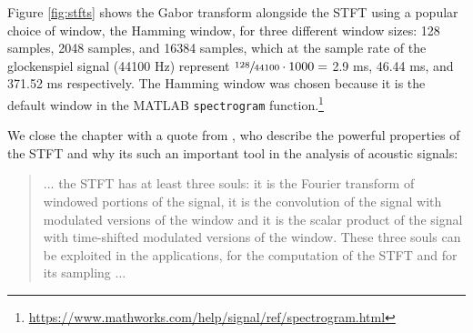 \documentclass[report.tex]{subfiles}
\begin{document}
Figure \ref{fig:stfts} shows the Gabor transform alongside the STFT using a popular choice of window, the Hamming window, for three different window sizes: 128 samples, 2048 samples, and 16384 samples, which at the sample rate of the glockenspiel signal (44100 Hz) represent $\sfrac{128}{44100}\cdot 1000 = $ 2.9 ms, 46.44 ms, and 371.52 ms respectively. The Hamming window was chosen because it is the default window in the MATLAB \Verb#spectrogram# function.\footnote{\url{https://www.mathworks.com/help/signal/ref/spectrogram.html}}

We close the chapter with a quote from \textcite{doerflersouls}, who describe the powerful properties of the STFT and why its such an important tool in the analysis of acoustic signals:

\begin{quote}
       ... the STFT has at least three souls: it is the Fourier transform of windowed portions of the signal, it is the convolution of the signal with modulated versions of the window and it is the scalar product of the signal with time-shifted modulated versions of the window. These three souls can be exploited in the applications, for the computation of the STFT and for its sampling ...
\end{quote}
\end{document}
